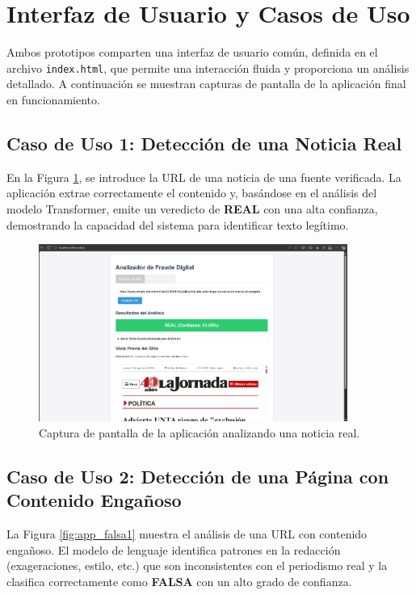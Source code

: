 \section{Interfaz de Usuario y Casos de Uso}
Ambos prototipos comparten una interfaz de usuario común, definida en el archivo \texttt{index.html}, que permite una interacción fluida y proporciona un análisis detallado. A continuación se muestran capturas de pantalla de la aplicación final en funcionamiento.

\subsection{Caso de Uso 1: Detección de una Noticia Real}
En la Figura \ref{fig:app_real}, se introduce la URL de una noticia de una fuente verificada. La aplicación extrae correctamente el contenido y, basándose en el análisis del modelo Transformer, emite un veredicto de \textbf{REAL} con una alta confianza, demostrando la capacidad del sistema para identificar texto legítimo.

\begin{figure}[htbp]
    \centering
    \includegraphics[width=0.9\textwidth]{Imagenes/app_real.png} %
    \caption{Captura de pantalla de la aplicación analizando una noticia real.}
    \label{fig:app_real}
\end{figure}

\subsection{Caso de Uso 2: Detección de una Página con Contenido Engañoso}
La Figura \ref{fig:app_falsa1} muestra el análisis de una URL con contenido engañoso. El modelo de lenguaje identifica patrones en la redacción (exageraciones, estilo, etc.) que son inconsistentes con el periodismo real y la clasifica correctamente como \textbf{FALSA} con un alto grado de confianza.

